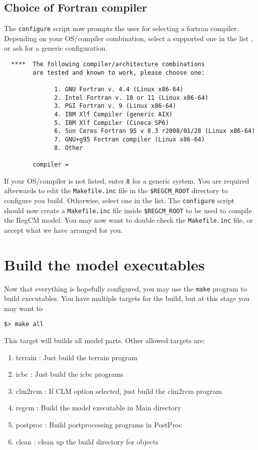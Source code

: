 \subsection{Choice of Fortran compiler}

The \verb=configure= script now prompts the user for selecting a fortran
compiler. Depending on your OS/compiler combination, select a supported one in the list
, or ask for a generic configuration.

\begin{Verbatim}
  ****  The following compiler/architecture combinations 
        are tested and known to work, please choose one:

              1. GNU Fortran v. 4.4 (Linux x86-64)
              2. Intel Fortran v. 10 or 11 (Linux x86-64)
              3. PGI Fortran v. 9 (Linux x86-64)
              4. IBM Xlf Compiler (generic AIX)
              5. IBM Xlf Compiler (Cineca SP6)
              6. Sun Ceres Fortran 95 v 8.3 r2008/01/28 (Linux x86-64)
              7. GNU+g95 Fortran compiler (Linux x86-64)
              8. Other

        compiler =
\end{Verbatim}

If your OS/compiler is not listed, enter \verb=8= for a generic system.
You are required afterwards to edit the \verb=Makefile.inc= file in the
\verb=$REGCM_ROOT= directory to configure you build.
Otherwise, select one in the list. The \verb=configure= script should now
create a \verb=Makefile.inc= file inside \verb=$REGCM_ROOT= to be used
to compile the RegCM model. You may now want to double check
the \verb=Makefile.inc= file, or accept what we have arranged for you.

\section{Build the model executables}

Now that everything is hopefully configured, you may use the \verb=make=
program to build executables.
You have multiple targets for the build, but at this stage you may want to

\begin{Verbatim}
$> make all
\end{Verbatim}

This target will builds all model parts. Other allowed targets are:

\begin{enumerate}
\item terrain : Just build the terrain program
\item icbc : Just build the icbc programs
\item clm2rcm : If CLM option selected, just build the clm2rcm program
\item regcm : Build the model executable in Main directory
\item postproc : Build postprocessing programs in PostProc
\item clean : clean up the build directory for objects
\end{enumerate}

